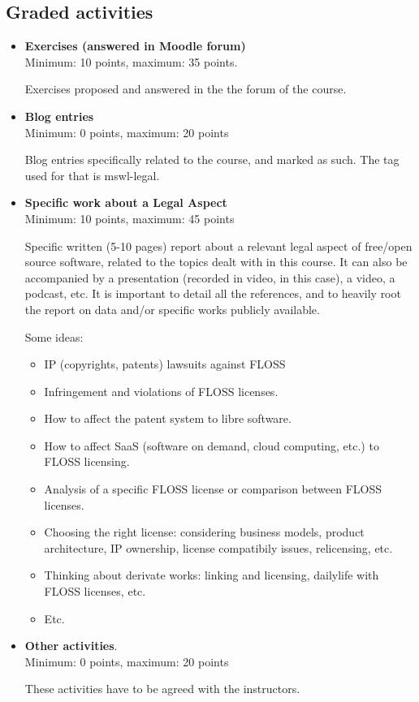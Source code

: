 \documentclass[a4paper]{article}
\begin{document}
\subsection{Graded activities}

\begin{itemize}
\item \textbf{Exercises (answered in Moodle forum)} \\
  Minimum: 10 points, maximum: 35 points.

  Exercises proposed and answered in the the forum of the course.

\item \textbf{Blog entries} \\
  Minimum: 0 points, maximum: 20 points

  Blog entries specifically related to the course, and marked as such. The tag used for that is mswl-legal.

\item \textbf{Specific work about a Legal Aspect} \\
  Minimum: 10 points, maximum: 45 points

  Specific written (5-10 pages) report about a relevant legal aspect of free/open source software, related to the topics dealt with in this course. It can also be accompanied by a presentation (recorded in video, in this case), a video, a podcast, etc. It is important to detail all the references, and to heavily root the report on data and/or specific works publicly available.

\medskip

Some ideas:

\begin{itemize}
\item IP (copyrights, patents) lawsuits against FLOSS
\item Infringement and violations of FLOSS licenses.
\item How to affect the patent system to libre software.
\item How to affect SaaS (software on demand, cloud computing, etc.) to FLOSS licensing.
\item Analysis of a specific FLOSS license or comparison between FLOSS licenses.
\item Choosing the right license: considering business models, product architecture,  IP ownership, license compatibily issues, relicensing, etc.
\item Thinking about derivate works: linking and licensing, dailylife with FLOSS licenses, etc.
\item Etc.

\end{itemize}



\item \textbf{Other activities}. \\
  Minimum: 0 points, maximum: 20 points

  These activities have to be agreed with the instructors.
\end{itemize}
\end{document}
